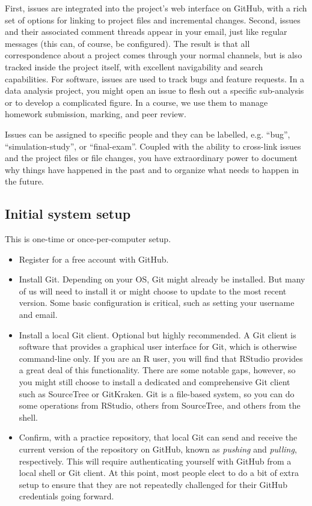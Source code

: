 \documentclass[12pt]{article}
\begin{document}
First, issues are integrated into the project's web interface on GitHub,
with a rich set of options for linking to project files and incremental
changes. Second, issues and their associated comment threads appear in
your email, just like regular messages (this can, of course, be
configured). The result is that all correspondence about a project comes
through your normal channels, but is also tracked inside the project
itself, with excellent navigability and search capabilities. For
software, issues are used to track bugs and feature requests. In a data
analysis project, you might open an issue to flesh out a specific
sub-analysis or to develop a complicated figure. In a course, we use
them to manage homework submission, marking, and peer review.

Issues can be assigned to specific people and they can be labelled, e.g.
``bug'', ``simulation-study'', or ``final-exam''. Coupled with the
ability to cross-link issues and the project files or file changes, you
have extraordinary power to document why things have happened in the
past and to organize what needs to happen in the future.

\subsection{Initial system setup}\label{initial-system-setup}

This is one-time or once-per-computer setup.

\begin{itemize}
\item
  Register for a free account with GitHub.
\item
  Install Git. Depending on your OS, Git might already be installed. But
  many of us will need to install it or might choose to update to the
  most recent version. Some basic configuration is critical, such as
  setting your username and email.
\item
  Install a local Git client. Optional but highly recommended. A Git
  client is software that provides a graphical user interface for Git,
  which is otherwise command-line only. If you are an R user, you will
  find that RStudio provides a great deal of this functionality. There
  are some notable gaps, however, so you might still choose to install a
  dedicated and comprehensive Git client such as SourceTree or
  GitKraken. Git is a file-based system, so you can do some operations
  from RStudio, others from SourceTree, and others from the shell.
\item
  Confirm, with a practice repository, that local Git can send and
  receive the current version of the repository on GitHub, known as
  \emph{pushing} and \emph{pulling}, respectively. This will require
  authenticating yourself with GitHub from a local shell or Git client.
  At this point, most people elect to do a bit of extra setup to ensure
  that they are not repeatedly challenged for their GitHub credentials
  going forward.
\end{itemize}
\end{document}
